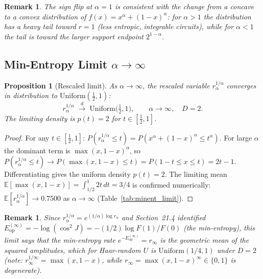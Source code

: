 \documentclass[12pt,a4paper]{article}
\newtheorem{proposition}[theorem]{Proposition}
\newtheorem{remark}[theorem]{Remark}
\begin{document}
\begin{remark}
The sign flip at $\alpha=1$ is consistent with the change from a concave to a convex
distribution of $f(x)=x^\alpha+(1-x)^\alpha$:
for $\alpha>1$ the distribution has a heavy tail toward $r=1$ (less entropic, integrable
circuits), while for $\alpha<1$ the tail is toward the larger support endpoint $2^{1-\alpha}$.
\end{remark}

\subsection{Min-Entropy Limit $\alpha\to\infty$}
\label{subsec:minent_limit}

\begin{proposition}[Rescaled limit]\label{prop:minent_limit}
As $\alpha\to\infty$, the rescaled variable $r_\alpha^{1/\alpha}$ converges in distribution
to $\mathrm{Uniform}(\tfrac{1}{2},1)$:
\[
  r_\alpha^{1/\alpha}\;\xrightarrow{d}\;\mathrm{Uniform}\!\bigl(\tfrac{1}{2},1\bigr),
  \qquad \alpha\to\infty,\quad D=2.
\]
The limiting density is $p(t)=2$ for $t\in[\tfrac{1}{2},1]$.
\end{proposition}

\begin{proof}
For any $t\in[\tfrac{1}{2},1]$:
$P(r_\alpha^{1/\alpha}\leq t)=P(x^\alpha+(1-x)^\alpha\leq t^\alpha)$.
For large $\alpha$ the dominant term is $\max(x,1-x)^\alpha$, so
$P(r_\alpha^{1/\alpha}\leq t)\to P(\max(x,1-x)\leq t)=P(1-t\leq x\leq t)=2t-1$.
Differentiating gives the uniform density $p(t)=2$.
The limiting mean $\mathbb{E}[\max(x,1-x)]=\int_{1/2}^1 2t\,dt=3/4$
is confirmed numerically: $\mathbb{E}[r_\alpha^{1/\alpha}]\to0.7500$ as $\alpha\to\infty$
(Table~\ref{tab:minent_limit}).
\end{proof}

\begin{remark}
Since $r_\alpha^{1/\alpha}=e^{(1/\alpha)\log r_\alpha}$ and Section~21.4 identified
$E_\mathrm{op}^{(\infty)}=-\log(\cos^2J)=-(1/2)\log F(1)/F(0)$ (the min-entropy),
this limit says that the min-entropy rate $e^{-E_\mathrm{op}^{(\infty)}}=r_\infty$
is the geometric mean of the squared amplitudes, which for Haar-random $U$ is
$\mathrm{Uniform}(1/4,1)$ under $D=2$ (note: $r_\infty^{1/\infty}=\max(x,1-x)$,
while $r_\infty=\max(x,1-x)^\infty\in\{0,1\}$ is degenerate).
\end{remark}
\end{document}
